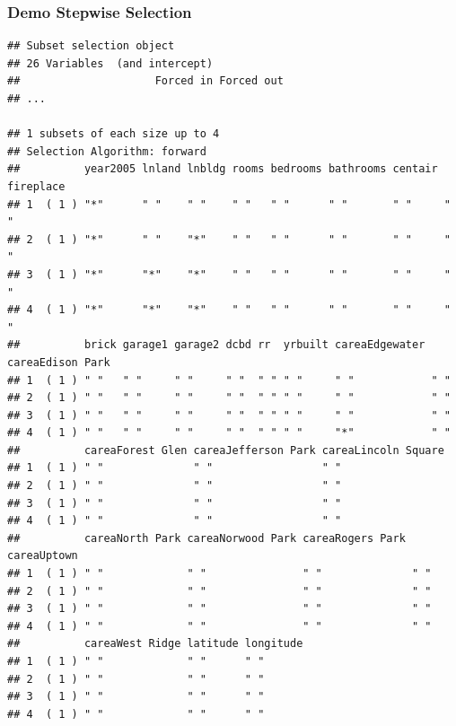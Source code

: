 \documentclass[
  shownotes,
  xcolor={svgnames},
  hyperref={colorlinks,citecolor=DarkBlue,linkcolor=DarkRed,urlcolor=DarkBlue}
  , aspectratio=169]{beamer}
\newenvironment{Shaded}{\begin{snugshade}}{\end{snugshade}}
\newcommand{\KeywordTok}[1]{\textcolor[rgb]{0.13,0.29,0.53}{\textbf{#1}}}
\newcommand{\NormalTok}[1]{#1}
\newcommand{\OperatorTok}[1]{\textcolor[rgb]{0.81,0.36,0.00}{\textbf{#1}}}
\begin{document}
\begin{frame}[fragile]
\frametitle{Demo Stepwise Selection}

\begin{scriptsize}
\begin{Shaded}
\end{Shaded}
\end{scriptsize}
\begin{tiny}
\begin{verbatim}
## Subset selection object
## 26 Variables  (and intercept)
##                     Forced in Forced out
## ...

## 1 subsets of each size up to 4
## Selection Algorithm: forward
##          year2005 lnland lnbldg rooms bedrooms bathrooms centair fireplace
## 1  ( 1 ) "*"      " "    " "    " "   " "      " "       " "     " "      
## 2  ( 1 ) "*"      " "    "*"    " "   " "      " "       " "     " "      
## 3  ( 1 ) "*"      "*"    "*"    " "   " "      " "       " "     " "      
## 4  ( 1 ) "*"      "*"    "*"    " "   " "      " "       " "     " "      
##          brick garage1 garage2 dcbd rr  yrbuilt careaEdgewater careaEdison Park
## 1  ( 1 ) " "   " "     " "     " "  " " " "     " "            " "             
## 2  ( 1 ) " "   " "     " "     " "  " " " "     " "            " "             
## 3  ( 1 ) " "   " "     " "     " "  " " " "     " "            " "             
## 4  ( 1 ) " "   " "     " "     " "  " " " "     "*"            " "             
##          careaForest Glen careaJefferson Park careaLincoln Square
## 1  ( 1 ) " "              " "                 " "                
## 2  ( 1 ) " "              " "                 " "                
## 3  ( 1 ) " "              " "                 " "                
## 4  ( 1 ) " "              " "                 " "                
##          careaNorth Park careaNorwood Park careaRogers Park careaUptown
## 1  ( 1 ) " "             " "               " "              " "        
## 2  ( 1 ) " "             " "               " "              " "        
## 3  ( 1 ) " "             " "               " "              " "        
## 4  ( 1 ) " "             " "               " "              " "        
##          careaWest Ridge latitude longitude
## 1  ( 1 ) " "             " "      " "      
## 2  ( 1 ) " "             " "      " "      
## 3  ( 1 ) " "             " "      " "      
## 4  ( 1 ) " "             " "      " "
\end{verbatim}
\end{tiny}


\end{frame}
\end{document}
